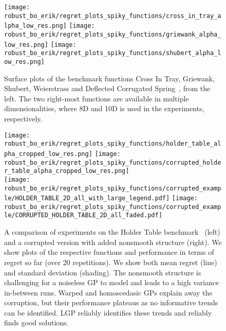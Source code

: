 \begin{figure}[t]
    \centering
    \texttt{[image: robust\_bo\_erik/regret\_plots\_spiky\_functions/cross\_in\_tray\_alpha\_low\_res.png]}
    \texttt{[image: robust\_bo\_erik/regret\_plots\_spiky\_functions/griewank\_alpha\_low\_res.png]}
    \texttt{[image: robust\_bo\_erik/regret\_plots\_spiky\_functions/shubert\_alpha\_low\_res.png]}
    \caption{
        Surface plots of the benchmark functions Cross In Tray, Griewank, Shubert, Weierstrass and Deflected Corrugated Spring~\parencite{mccourt_optimization_2016}, from the left.
        The two right-most functions are available in multiple dimensionalities, where 8D and 10D is used in the experiments, respectively.
        \label{fig:bayesian_optimization:functions_plots}
    }
\end{figure}
\begin{figure}[t]
    \centering

    \texttt{[image: robust\_bo\_erik/regret\_plots\_spiky\_functions/holder\_table\_alpha\_cropped\_low\_res.png]}
    \texttt{[image: robust\_bo\_erik/regret\_plots\_spiky\_functions/corrupted\_holder\_table\_alpha\_cropped\_low\_res.png]}\\
    \vspace{-2cm}
    \texttt{[image: robust\_bo\_erik/regret\_plots\_spiky\_functions/corrupted\_example/HOLDER\_TABLE\_2D\_all\_with\_large\_legend.pdf]}
    \texttt{[image: robust\_bo\_erik/regret\_plots\_spiky\_functions/corrupted\_example/CORRUPTED\_HOLDER\_TABLE\_2D\_all\_faded.pdf]}
    \caption{
        A comparison of experiments on the Holder Table benchmark~\parencite{mccourt_optimization_2016} (left) and a corrupted version with added nonsmooth structure (right).
        We show plots of the respective functions and performance in terms of regret so far (over 20 repetitions).
        We show both mean regret (line) and standard deviation (shading).
        The nonsmooth structure is challenging for a noiseless GP to model and leads to a high variance in-between runs.
        Warped and homoscedasic GPs explain away the corruption, but their performance plateaus as no informative trends can be identified.
        LGP reliably identifies these trends and reliably finds good solutions.
    }

    \label{fig:bayesian_optimization:corrupted_holder}
\end{figure}

